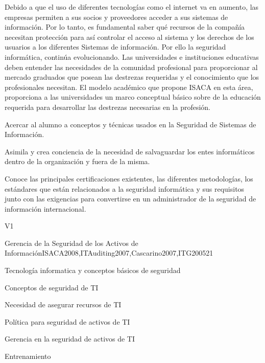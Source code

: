 \begin{syllabus}
\begin{justification}
Debido a que el uso de diferentes tecnologías como el internet va en aumento, las empresas permiten a sus socios y proveedores acceder a sus sistemas de información. Por lo tanto, es fundamental saber qué recursos de la compañía necesitan protección para así controlar el acceso al sistema y los derechos de los usuarios a los diferentes Sistemas de información.  Por ello la seguridad informática, continúa evolucionando. Las universidades e instituciones educativas deben entender las necesidades de la comunidad profesional para proporcionar al mercado graduados que posean las destrezas requeridas y el conocimiento que los profesionales necesitan. El modelo académico que propone  ISACA en esta área, proporciona a las universidades un marco conceptual básico sobre de la educación requerida para desarrollar las destrezas necesarias en la profesión.
\end{justification}

\begin{goals}
\item Acercar al alumno a conceptos y técnicas usados en la Seguridad de Sistemas de Información.
\item Asimila y crea conciencia de la necesidad de salvaguardar los entes informáticos dentro de la organización y fuera de la misma.
\item Conoce las principales certificaciones existentes, las diferentes metodologías, los estándares que están relacionados a la seguridad informática y sus requisitos junto con las exigencias para convertirse en un administrador de la seguridad de información internacional.
\end{goals}

\begin{outcomes}{V1}
\end{outcomes}

\begin{unit}{Gerencia de la Seguridad de los Activos de Información}{}{ISACA2008,ITAuditing2007,Cascarino2007,ITG2005}{2}{1}
\begin{topics}
\item Tecnología informatica y conceptos básicos de seguridad
\item Conceptos de seguridad de TI 
\item Necesidad de asegurar recursos de TI
\item Política para seguridad de activos de TI 
\item Gerencia en la seguridad de activos de TI 
\item Entrenamiento
\end{topics}


\end{unit}
\end{syllabus}
